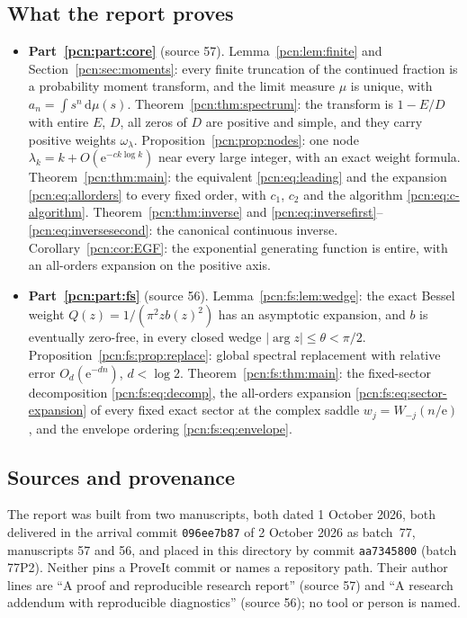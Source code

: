 \documentclass[11pt,letterpaper]{article}
\theoremstyle{remark}\newtheorem{remark}[theorem]{Remark}
\newcommand{\dd}{\,\mathrm d}
\newcommand{\ee}{\mathrm e}
\begin{document}
\subsection*{What the report proves}
\label{pcn:guide:results}
\begin{itemize}
\item \textbf{Part~\ref{pcn:part:core}} (source 57). Lemma~\ref{pcn:lem:finite} and Section~\ref{pcn:sec:moments}: every finite truncation of the continued fraction is a probability moment transform, and the limit measure $\mu$ is unique, with $a_n=\int s^n\dd\mu(s)$. Theorem~\ref{pcn:thm:spectrum}: the transform is $1-E/D$ with entire $E$, $D$, all zeros of $D$ are positive and simple, and they carry positive weights $\omega_\lambda$. Proposition~\ref{pcn:prop:nodes}: one node $\lambda_k=k+O(\ee^{-ck\log k})$ near every large integer, with an exact weight formula. Theorem~\ref{pcn:thm:main}: the equivalent \eqref{pcn:eq:leading} and the expansion \eqref{pcn:eq:allorders} to every fixed order, with $c_1$, $c_2$ and the algorithm \eqref{pcn:eq:c-algorithm}. Theorem~\ref{pcn:thm:inverse} and \eqref{pcn:eq:inversefirst}--\eqref{pcn:eq:inversesecond}: the canonical continuous inverse. Corollary~\ref{pcn:cor:EGF}: the exponential generating function is entire, with an all-orders expansion on the positive axis.
\item \textbf{Part~\ref{pcn:part:fs}} (source 56). Lemma~\ref{pcn:fs:lem:wedge}: the exact Bessel weight $Q(z)=1/(\pi^2zb(z)^2)$ has an asymptotic expansion, and $b$ is eventually zero-free, in every closed wedge $|\arg z|\le\theta<\pi/2$. Proposition~\ref{pcn:fs:prop:replace}: global spectral replacement with relative error $O_d(\ee^{-dn})$, $d<\log 2$. Theorem~\ref{pcn:fs:thm:main}: the fixed-sector decomposition \eqref{pcn:fs:eq:decomp}, the all-orders expansion \eqref{pcn:fs:eq:sector-expansion} of every fixed exact sector at the complex saddle $w_j=W_{-j}(n/\ee)$, and the envelope ordering \eqref{pcn:fs:eq:envelope}.
\end{itemize}

\subsection*{Sources and provenance}
\label{pcn:guide:provenance}
The report was built from two manuscripts, both dated 1 October 2026, both delivered in the arrival commit \texttt{096ee7b87} of 2 October 2026 as batch~77, manuscripts 57 and 56, and placed in this directory by commit \texttt{aa7345800} (batch 77P2). Neither pins a ProveIt commit or names a repository path. Their author lines are ``A proof and reproducible research report'' (source 57) and ``A research addendum with reproducible diagnostics'' (source 56); no tool or person is named.
\end{document}
